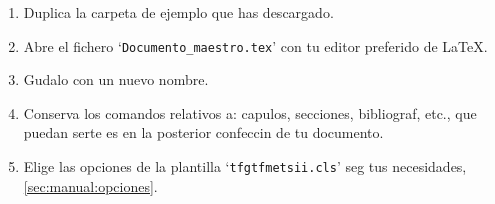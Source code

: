 \begin{enumerate}

	\item Duplica la carpeta de ejemplo que has descargado.
    \item Abre el fichero `\verb'Documento_maestro.tex'' con tu editor preferido de \LaTeX.
    \item Gudalo con un nuevo nombre.
    \item Conserva los comandos relativos a: capulos, secciones, bibliograf, etc., que puedan serte es en la posterior confeccin de tu documento.
    \item Elige las opciones de la plantilla `\texttt{tfgtfmetsii.cls}' seg tus necesidades, \autoref{sec:manual:opciones}.
        

\end{enumerate}



